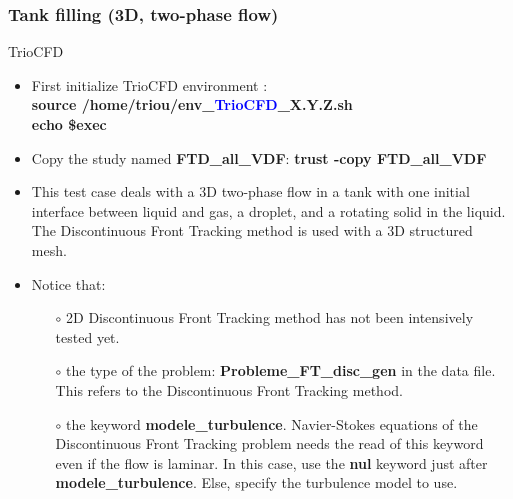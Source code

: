 \documentclass[10pt, hyperref={unicode=true,pdfusetitle, bookmarks=true,bookmarksnumbered=false,bookmarksopen=false, breaklinks=false,pdfborder={0 0 1},backref=true,colorlinks=true,linkcolor=darkblue,pageanchor}]{beamer}
\begin{document}
\begin{frame}
\frametitle{Tank filling (3D, two-phase flow)}
\begin{block}{TrioCFD}

\begin{itemize}
\item First initialize TrioCFD environment :\\
\textbf{source /home/triou/env\_\textcolor{blue}{TrioCFD}\_X.Y.Z.sh }\\
\textbf{echo \$exec} 

\item Copy the study named \textbf{FTD\_all\_VDF}: \textbf{trust -copy FTD\_all\_VDF}

\item This test case deals with a 3D two-phase flow in a tank with one initial interface between liquid and gas, a droplet, and a rotating solid in the liquid. The Discontinuous Front Tracking method is used with a 3D structured mesh.

\item Notice that:
    \begin{itemize}
    \item [$\circ$] 2D Discontinuous Front Tracking method has not been intensively tested yet.
    \item [$\circ$] the type of the problem: \textbf{Probleme\_FT\_disc\_gen} in the data file. This refers to the Discontinuous Front Tracking method.
    \item [$\circ$] the keyword \textbf{modele\_turbulence}. Navier-Stokes equations of the Discontinuous Front Tracking problem needs the read of this keyword even if the flow is laminar. In this case, use the \textbf{nul} keyword just after \textbf{modele\_turbulence}. Else, specify the turbulence model to use.
    \end{itemize}
\end{itemize}

\end{block}
\end{frame}
\end{document}
